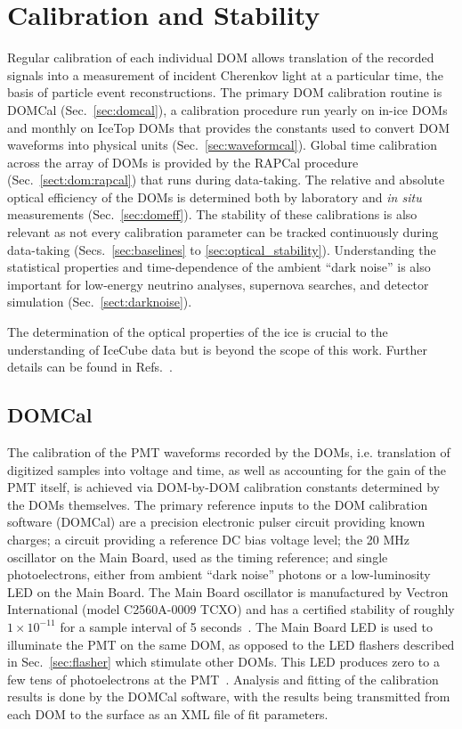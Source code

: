 \section{\label{sec:dom_calibration}Calibration and Stability}

Regular calibration of each individual DOM allows translation of the
recorded signals into a measurement of incident Cherenkov light at a
particular time, the basis of particle event reconstructions.  The
primary DOM calibration routine is DOMCal (Sec.~\ref{sec:domcal}), a
calibration procedure run yearly on in-ice DOMs and monthly on IceTop
DOMs that provides the constants used to convert DOM waveforms into
physical units (Sec.~\ref{sec:waveformcal}).  Global time calibration across the array of DOMs is 
provided by the RAPCal procedure (Sec.~\ref{sect:dom:rapcal}) that runs during
data-taking.  The relative and absolute optical efficiency of the DOMs is
determined both by laboratory and \emph{in situ} measurements
(Sec.~\ref{sec:domeff}). The stability of these calibrations is also relevant
as not every calibration parameter can be tracked continuously during
data-taking (Secs.~\ref{sec:baselines} to \ref{sec:optical_stability}).
Understanding the statistical properties and time-dependence of the ambient ``dark
noise'' is also important for low-energy neutrino analyses, supernova
searches, and detector simulation (Sec.~\ref{sect:darknoise}).

The determination of the optical properties of the ice is crucial to
the understanding of IceCube data but is beyond the scope of this work.
Further details can be found in Refs.~\cite{Aartsen:2013rt,IC3:spice_lea}.

\subsection{\label{sec:domcal}DOMCal}

The calibration of the PMT waveforms recorded by the DOMs, i.e. translation
of digitized samples into voltage and time, as well as accounting for the
gain of the PMT itself, is achieved via DOM-by-DOM calibration constants
determined by the DOMs themselves. The primary reference inputs to
the DOM calibration software (DOMCal) are a precision electronic
pulser circuit providing known charges; a circuit providing a reference DC
bias voltage level; the 20 MHz oscillator on the Main
Board, used as the timing reference; and single photoelectrons, either from
ambient ``dark noise'' photons or a low-luminosity LED on the Main
Board.  The Main Board oscillator is manufactured by Vectron
International (model C2560A-0009 TCXO) and has a certified stability
of roughly $1 \times 10^{-11}$ for a sample interval of 5 seconds~\cite{ICECUBE:DAQ}.
The Main Board LED is used to illuminate the PMT on the same DOM, as opposed
to the LED flashers described in 
Sec.~\ref{sec:flasher} which stimulate other DOMs. This LED produces
zero to a few tens of photoelectrons at the PMT~\cite{ICECUBE:DAQ}. Analysis and fitting of the
calibration results is done by the DOMCal software, with the results being
transmitted from each DOM to the surface as an XML file of fit parameters.

